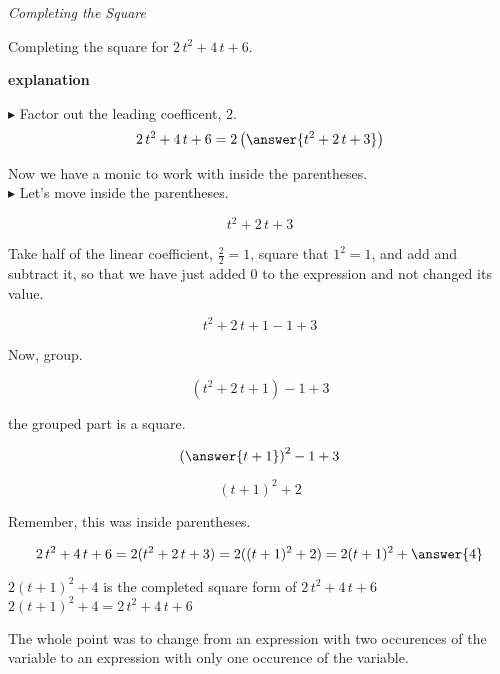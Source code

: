 \documentclass{ximera}
\begin{document}
\begin{example} \textit{Completing the Square}



Completing the square for $2 \, t^2 + 4 \, t + 6$.


\textbf{\textcolor{red!75!green}{explanation}} 

$\blacktriangleright$ Factor out the leading coefficent, $2$.\\

\[     2 \, t^2 + 4 \, t + 6 = 2 \left( \answer{t^2 + 2 \, t + 3} \right)   \] 


Now we have a monic to work with inside the parentheses. \\


$\blacktriangleright$ Let's move inside the parentheses.

\[ t^2 + 2 \, t + 3 \]

Take half of the linear coefficient, $\frac{2}{2} = 1$, square that $1^2 = 1$, and add and subtract it, so that we have just added $0$ to the expression and not changed its value.


\[ t^2 + 2 \, t + 1 - 1 +3 \]


Now, group.

\[ (t^2 + 2 \, t + 1) - 1 + 3 \]

the grouped part is a square.

\[ \left( \answer{t+1} \right)^2 - 1 + 3 \]

\[ (t+1)^2 + 2 \]

Remember, this was inside parentheses.

\[     2 \, t^2 + 4 \, t + 6 = 2 (t^2 + 2 \, t + 3)  = 2 ((t+1)^2 + 2) =  2 (t+1)^2 + \answer{4}\] 


$2 (t+1)^2 + 4$ is the completed square form of $2 \, t^2 + 4 \, t + 6$ \\


$2 (t+1)^2 + 4 = 2 \, t^2 + 4 \, t + 6$





\end{example}














The whole point was to change from an expression with two occurences of the variable to an expression with only one occurence of the variable. \\
\end{document}
